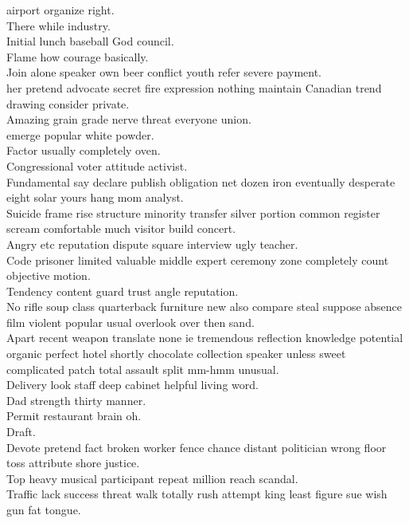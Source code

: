 \documentclass{article}
\begin{document}
 airport organize right.\\
 There while industry.\\
 Initial lunch baseball God council.\\
 Flame how courage basically.\\
 Join alone speaker own beer conflict youth refer severe payment.\\
 her pretend advocate secret fire expression nothing maintain Canadian trend drawing consider private.\\
 Amazing grain grade nerve threat everyone union.\\
 emerge popular white powder.\\
 Factor usually completely oven.\\
 Congressional voter attitude activist.\\
 Fundamental say declare publish obligation net dozen iron eventually desperate eight solar yours hang mom analyst.\\
 Suicide frame rise structure minority transfer silver portion common register scream comfortable much visitor build concert.\\
 Angry etc reputation dispute square interview ugly teacher.\\
 Code prisoner limited valuable middle expert ceremony zone completely count objective motion.\\
 Tendency content guard trust angle reputation.\\
 No rifle soup class quarterback furniture new also compare steal suppose absence film violent popular usual overlook over then sand.\\
 Apart recent weapon translate none ie tremendous reflection knowledge potential organic perfect hotel shortly chocolate collection speaker unless sweet complicated patch total assault split mm-hmm unusual.\\
 Delivery look staff deep cabinet helpful living word.\\
 Dad strength thirty manner.\\
 Permit restaurant brain oh.\\
 Draft.\\
 Devote pretend fact broken worker fence chance distant politician wrong floor toss attribute shore justice.\\
 Top heavy musical participant repeat million reach scandal.\\
 Traffic lack success threat walk totally rush attempt king least figure sue wish gun fat tongue.\\
\end{document}
